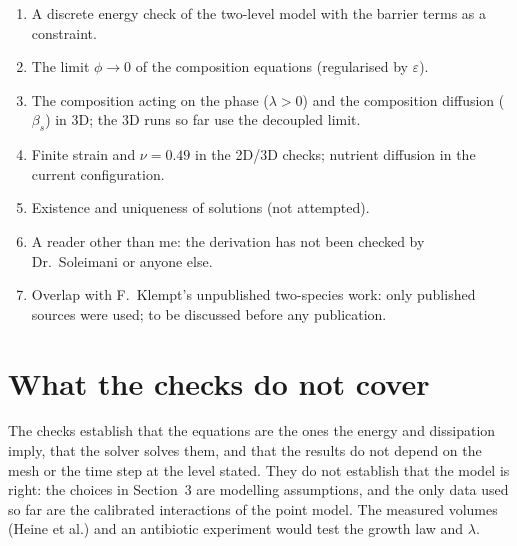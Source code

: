 \documentclass[11pt,a4paper]{article}
\begin{document}
\begin{enumerate}
\item A discrete energy check of the two-level model with the barrier terms as a constraint.
\item The limit $\phi\to0$ of the composition equations (regularised by $\varepsilon$).
\item The composition acting on the phase ($\lambda>0$) and the composition diffusion
  ($\beta_s$) in 3D; the 3D runs so far use the decoupled limit.
\item Finite strain and $\nu=0.49$ in the 2D/3D checks; nutrient diffusion in the current
  configuration.
\item Existence and uniqueness of solutions (not attempted).
\item A reader other than me: the derivation has not been checked by Dr.\ Soleimani or
  anyone else.
\item Overlap with F.\ Klempt's unpublished two-species work: only published sources were
  used; to be discussed before any publication.
\end{enumerate}

\section{What the checks do not cover}

The checks establish that the equations are the ones the energy and dissipation imply, that
the solver solves them, and that the results do not depend on the mesh or the time step at
the level stated. They do not establish that the model is right: the choices in Section~3 are
modelling assumptions, and the only data used so far are the calibrated interactions of the
point model. The measured volumes (Heine et al.) and an antibiotic experiment would test the
growth law and $\lambda$.
\end{document}
